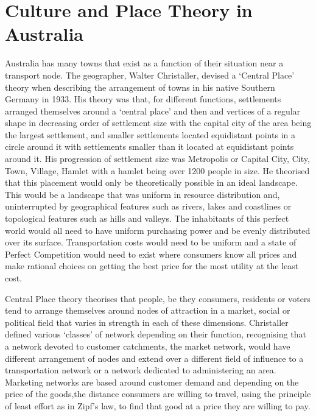 \section{Culture and Place Theory in Australia}
Australia has many towns that exist as a function of their situation near a transport node. The geographer, Walter Christaller, devised a `Central Place' theory when describing the arrangement of towns in his native Southern Germany in 1933. His theory was that, for different functions, settlements arranged themselves around a `central place' and then and vertices of a regular shape in decreasing order of settlement size with the capital city of the area being the largest settlement, and smaller settlements located equidistant points in a circle around it with settlements smaller than it located at equidistant points around it. His progression of settlement size was Metropolis or Capital City, City, Town, Village, Hamlet with a hamlet being over 1200 people in size. He theorised that this placement would only be theoretically possible in an ideal landscape. This would be a landscape that was uniform in resource distribution and, uninterrupted by geographical features such as rivers, lakes and coastlines or topological features such as hills and valleys. The inhabitants of this perfect world would all need to have uniform purchasing power and be evenly distributed over its surface. Transportation costs would need to be uniform and a state of Perfect Competition would need to exist where consumers know all prices and make rational choices on getting the best price for the most utility at the least cost\cite{RefWorks:306}.

Central Place theory theorises that people, be they consumers, residents or voters tend to arrange themselves around nodes of attraction in a market, social or political field that varies in strength in each of these dimensions. Christaller defined various `classes' of network depending on their function, recognising that a network devoted to customer catchments, the market network, would have different arrangement of nodes and extend over a different field of influence to a transportation network or a network dedicated to administering an area. Marketing networks are based around customer demand and depending on the price of the goods,the distance consumers are willing to travel, using the principle of least effort as in Zipf's law, to find that good at a price they are willing to pay. 

